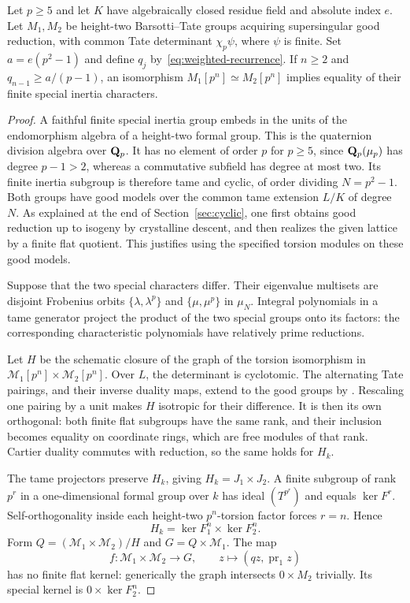 \begin{theorem}\label{thm:common-determinant}
Let $p\ge5$ and let $K$ have algebraically closed residue field and absolute index $e$. Let $M_1,M_2$ be height-two Barsotti--Tate groups acquiring supersingular good reduction, with common Tate determinant $\chi_p\psi$, where $\psi$ is finite. Set $a=e(p^2-1)$ and define $q_j$ by~\eqref{eq:weighted-recurrence}. If $n\ge2$ and $q_{n-1}\ge a/(p-1)$, an isomorphism $M_1[p^n]\simeq M_2[p^n]$ implies equality of their finite special inertia characters.
\end{theorem}
\begin{proof}
A faithful finite special inertia group embeds in the units of the endomorphism algebra of a height-two formal group. This is the quaternion division algebra over $\mathbf Q_p$. It has no element of order $p$ for $p\ge5$, since $\mathbf Q_p(\mu_p)$ has degree $p-1>2$, whereas a commutative subfield has degree at most two. Its finite inertia subgroup is therefore tame and cyclic, of order dividing $N=p^2-1$. Both groups have good models over the common tame extension $L/K$ of degree $N$. As explained at the end of Section~\ref{sec:cyclic}, one first obtains good reduction up to isogeny by crystalline descent, and then realizes the given lattice by a finite flat quotient. This justifies using the specified torsion modules on these good models.

Suppose that the two special characters differ. Their eigenvalue multisets are disjoint Frobenius orbits $\{\lambda,\lambda^p\}$ and $\{\mu,\mu^p\}$ in $\mu_N$. Integral polynomials in a tame generator project the product of the two special groups onto its factors: the corresponding characteristic polynomials have relatively prime reductions.

Let $H$ be the schematic closure of the graph of the torsion isomorphism in $\mathcal M_1[p^n]\times\mathcal M_2[p^n]$. Over $L$, the determinant is cyclotomic. The alternating Tate pairings, and their inverse duality maps, extend to the good groups by \citet[Theorem~4, p.~180, and Corollaries~1--2, p.~181]{Tate1967}. Rescaling one pairing by a unit makes $H$ isotropic for their difference. It is then its own orthogonal: both finite flat subgroups have the same rank, and their inclusion becomes equality on coordinate rings, which are free modules of that rank. Cartier duality commutes with reduction, so the same holds for $H_k$.

The tame projectors preserve $H_k$, giving $H_k=J_1\times J_2$. A finite subgroup of rank $p^r$ in a one-dimensional formal group over $k$ has ideal $(T^{p^r})$ and equals $\ker F^r$. Self-orthogonality inside each height-two $p^n$-torsion factor forces $r=n$. Hence
\[
                        H_k=\ker F_1^n\times\ker F_2^n.
\]
Form $Q=(\mathcal M_1\times\mathcal M_2)/H$ and $G=Q\times\mathcal M_1$. The map
\[
 f:\mathcal M_1\times\mathcal M_2\longrightarrow G,
             \qquad z\longmapsto(qz,\operatorname{pr}_1z)
\]
has no finite flat kernel: generically the graph intersects $0\times M_2$ trivially. Its special kernel is $0\times\ker F_2^n$.


\end{proof}
